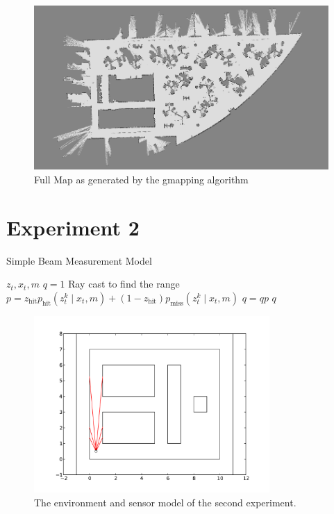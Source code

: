 \documentclass[english]{article}
\begin{document}
\begin{landscape}
\begin{figure}[p]
 \centering
 \includegraphics[width=1.0\textwidth]{images/FullMap.png}
 \caption{Full Map as generated by the gmapping algorithm}
 \label{fig:gmapping}
\end{figure}
\end{landscape}


\pagebreak
\section{Experiment 2}


\begin{algorithm}
\caption{Simple Beam Measurement Model}
\label{alg:ex2measurement}
\begin{algorithmic}
	\REQUIRE $z_t, x_t, m$
	\STATE $q = 1$
        \STATE Ray cast to find the range
        \STATE $p = z_{\textrm{hit}} p_{\textrm{hit}}(z_t^k \mid x_t, m) + (1 - z_{\textrm{hit}}) p_{\textrm{miss}}(z_t^k \mid x_t, m)$
        \STATE $q = q p$
	\ENDFOR
	\RETURN $q$
\end{algorithmic}
\end{algorithm}


\begin{figure}[htp]
  \centering
  \includegraphics[width=0.8\textwidth]{images/experiment2/measurement.pdf}
  \caption{The environment and sensor model of the second experiment.}
  \label{fig:ex2setup}
\end{figure}
\end{document}
